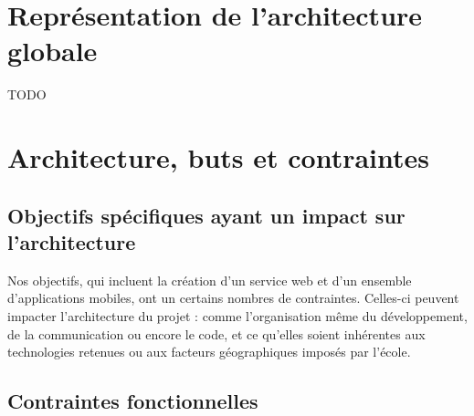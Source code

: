 \documentclass{life-fr}
\begin{document}

\chapter{Représentation de l’architecture globale}

TODO


\chapter{Architecture, buts et contraintes}
\section{Objectifs spécifiques ayant un impact sur l’architecture}

Nos objectifs, qui incluent la création d'un service web et d'un ensemble d'applications mobiles, ont un certains nombres de contraintes. Celles-ci peuvent impacter l'architecture du projet : comme l'organisation même du développement, de la communication ou encore le code, et ce qu'elles soient inhérentes aux technologies retenues ou aux facteurs géographiques imposés par l'école.

\section{Contraintes fonctionnelles}
\end{document}
